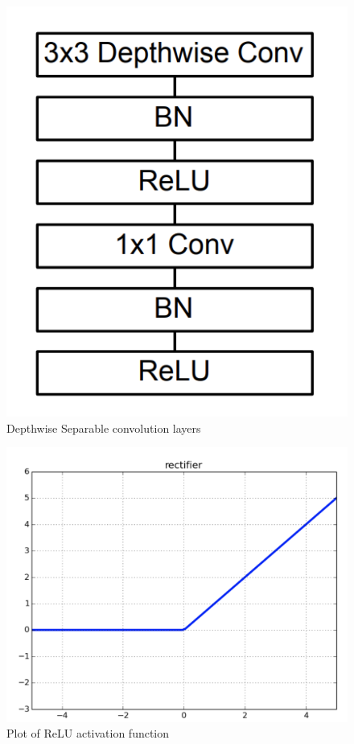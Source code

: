 \documentclass[11pt, titlepage]{article} %
\begin{document}
\begin{figure}[]
	\centering
   	\includegraphics[scale=0.5]{convolution4.png}
   	\caption{Depthwise Separable convolution layers}
   	\label{fig:convolution4}
\end{figure}

\begin{figure}[]
	\centering
   	\includegraphics[scale=0.3]{convolution5.png}
   	\caption{Plot of ReLU activation function}
   	\label{fig:convolution5}
\end{figure}
\end{document}
